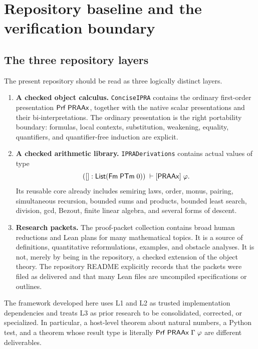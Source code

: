 \section{Repository baseline and the verification boundary}
\label{sec:baseline}

\subsection{The three repository layers}

The present repository should be read as three logically distinct layers.

\begin{enumerate}[label=\textbf{L\arabic*.},leftmargin=3.2em]
\item \textbf{A checked object calculus.}  \texttt{ConciseIPRA} contains the ordinary first-order presentation \(\mathsf{Prf}\;\mathsf{PRAAx}\), together with the native scalar presentations and their bi-interpretations.  The ordinary presentation is the right portability boundary: formulas, local contexts, substitution, weakening, equality, quantifiers, and quantifier-free induction are explicit.

\item \textbf{A checked arithmetic library.}  \texttt{IPRADerivations} contains actual values of type
\[
  ([] : \mathsf{List}(\mathsf{Fm}\;\mathsf{PTm}\;0))
  \;\vdash[\mathsf{PRAAx}]\;\varphi.
\]
Its reusable core already includes semiring laws, order, monus, pairing, simultaneous recursion, bounded sums and products, bounded least search, division, gcd, Bezout, finite linear algebra, and several forms of descent.

\item \textbf{Research packets.}  The proof-packet collection contains broad human reductions and Lean plans for many mathematical topics.  It is a source of definitions, quantitative reformulations, examples, and obstacle analyses.  It is not, merely by being in the repository, a checked extension of the object theory.  The repository README explicitly records that the packets were filed as delivered and that many Lean files are uncompiled specifications or outlines.
\end{enumerate}

The framework developed here uses L1 and L2 as trusted implementation dependencies and treats L3 as prior research to be consolidated, corrected, or specialized.  In particular, a host-level theorem about natural numbers, a Python test, and a theorem whose result type is literally \(\mathsf{Prf}\;\mathsf{PRAAx}\;\Gamma\;\varphi\) are different deliverables.

